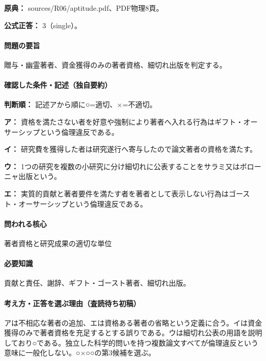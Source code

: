 \noindent\textbf{原典：} sources/R06/aptitude.pdf、PDF物理8頁。

\textbf{公式正答：} 3（single）。

\paragraph{問題の要旨} 贈与・幽霊著者、資金獲得のみの著者資格、細切れ出版を判定する。

\paragraph{確認した条件・記述（独自要約）}\mbox{}\par

\noindent\textbf{判断順：} 記述アから順に○=適切、×=不適切。\par

\noindent\textbf{ア：} 資格を満たさない者を好意や強制により著者へ入れる行為はギフト・オーサーシップという倫理違反である。\par

\noindent\textbf{イ：} 研究費を獲得した者は研究遂行へ寄与したので論文著者の資格を満たす。\par

\noindent\textbf{ウ：} 1つの研究を複数の小研究に分け細切れに公表することをサラミ又はボローニャ出版という。\par

\noindent\textbf{エ：} 実質的貢献と著者要件を満たす者を著者として表示しない行為はゴースト・オーサーシップという倫理違反である。\par

\paragraph{問われる核心} 著者資格と研究成果の適切な単位

\paragraph{必要知識} 貢献と責任、謝辞、ギフト・ゴースト著者、細切れ出版。

\paragraph{考え方・正答を選ぶ理由（査読待ち初稿）} アは不相応な著者の追加、エは資格ある著者の省略という定義に合う。イは資金獲得のみで著者資格を充足するとする誤りである。ウは細切れ公表の用語を説明しており○である。独立した科学的問いを持つ複数論文すべてが倫理違反という意味に一般化しない。○×○○の第3候補を選ぶ。

